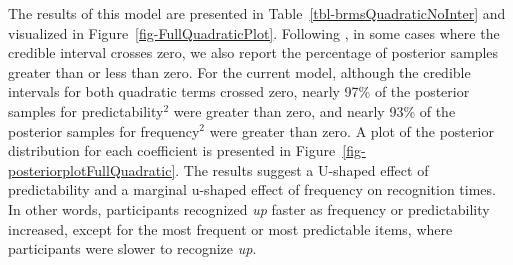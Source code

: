 \documentclass[
  authoryear,
  preprint,
  1p,
  onecolumn]{elsarticle}
\begin{document}
The results of this model are presented in
Table~\ref{tbl-brmsQuadraticNoInter} and visualized in
Figure~\ref{fig-FullQuadraticPlot}. Following
\citet{houghtonTaskdependentConsequencesDisfluency2023}, in some cases
where the credible interval crosses zero, we also report the percentage
of posterior samples greater than or less than zero. For the current
model, although the credible intervals for both quadratic terms crossed
zero, nearly 97\% of the posterior samples for predictability\(^2\) were
greater than zero, and nearly 93\% of the posterior samples for
frequency\(^2\) were greater than zero. A plot of the posterior
distribution for each coefficient is presented in
Figure~\ref{fig-posteriorplotFullQuadratic}. The results suggest a
U-shaped effect of predictability and a marginal u-shaped effect of
frequency on recognition times. In other words, participants recognized
\emph{up} faster as frequency or predictability increased, except for
the most frequent or most predictable items, where participants were
slower to recognize \emph{up}.

\begin{table}

\caption{\label{tbl-brmsQuadraticNoInter}Model results for the Bayesian
quadratic regression model containing fixed-effects for frequency,
predictability, and their quadratics.}


\end{table}%
\end{document}
